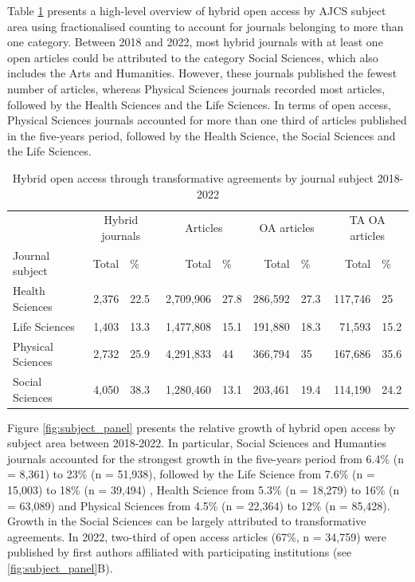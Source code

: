 \documentclass[a4paper,man,floatsintext,longtable,noextraspace,12pt]{apa6}
\begin{document}
Table \ref{tab:subject_summary_table} presents a high-level overview of
hybrid open access by AJCS subject area using fractionalised counting to
account for journals belonging to more than one category. Between 2018
and 2022, most hybrid journals with at least one open articles could be
attributed to the category Social Sciences, which also includes the Arts
and Humanities. However, these journals published the fewest number of
articles, whereas Physical Sciences journals recorded most articles,
followed by the Health Sciences and the Life Sciences. In terms of open
access, Physical Sciences journals accounted for more than one third of
articles published in the five-years period, followed by the Health
Science, the Social Sciences and the Life Sciences.

\begin{table}[H]

\caption{\label{tab:subject_summary_table}Hybrid open access through transformative agreements by journal subject 2018-2022}
\centering
\begin{tabular}[t]{lrlrlrlrl}
\toprule
\multicolumn{1}{c}{ } & \multicolumn{2}{c}{Hybrid journals} & \multicolumn{2}{c}{Articles} & \multicolumn{2}{c}{OA articles} & \multicolumn{2}{c}{TA OA articles} \\
\cmidrule(l{3pt}r{3pt}){2-3} \cmidrule(l{3pt}r{3pt}){4-5} \cmidrule(l{3pt}r{3pt}){6-7} \cmidrule(l{3pt}r{3pt}){8-9}
Journal subject & Total & \% & Total & \% & Total & \% & Total & \%\\
\midrule
Health Sciences & 2,376 & 22.5 & 2,709,906 & 27.8 & 286,592 & 27.3 & 117,746 & 25\\
Life Sciences & 1,403 & 13.3 & 1,477,808 & 15.1 & 191,880 & 18.3 & 71,593 & 15.2\\
Physical Sciences & 2,732 & 25.9 & 4,291,833 & 44 & 366,794 & 35 & 167,686 & 35.6\\
Social Sciences & 4,050 & 38.3 & 1,280,460 & 13.1 & 203,461 & 19.4 & 114,190 & 24.2\\
\bottomrule
\end{tabular}
\end{table}

Figure \ref{fig:subject_panel} presents the relative growth of hybrid
open access by subject area between 2018-2022. In particular, Social
Sciences and Humanties journals accounted for the strongest growth in
the five-years period from 6.4\% (n = 8,361) to 23\% (n = 51,938),
followed by the Life Science from 7.6\% (n = 15,003) to 18\% (n =
39,494) , Health Science from 5.3\% (n = 18,279) to 16\% (n = 63,089)
and Physical Sciences from 4.5\% (n = 22,364) to 12\% (n = 85,428).
Growth in the Social Sciences can be largely attributed to
transformative agreements. In 2022, two-third of open access articles
(67\%, n = 34,759) were published by first authors affiliated with
participating institutions (see \ref{fig:subject_panel}B).
\end{document}
